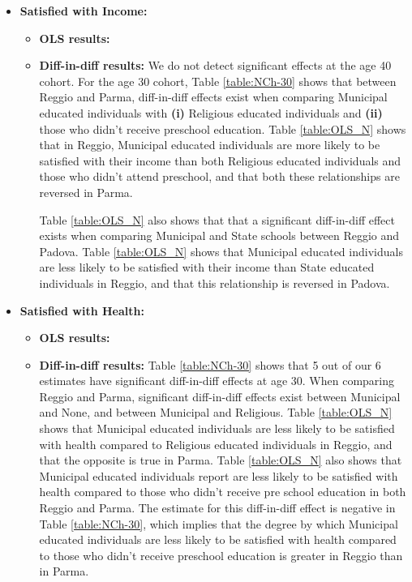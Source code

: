 \documentclass[11pt]{article}
\begin{document}
\begin{itemize}
\item \textbf{Satisfied with Income:} 
	
	\begin{itemize}
	\item \textbf{OLS results:} 
	
	\item \textbf{Diff-in-diff results:} We do not detect significant effects at the age 40 cohort. For the age 30 cohort, Table \ref{table:NCh-30} shows that between Reggio and Parma, diff-in-diff effects exist when comparing Municipal educated individuals with \textbf{(i)} Religious educated individuals and  \textbf{(ii)} those who didn't receive preschool education. Table \ref{table:OLS_N} shows that in Reggio, Municipal educated individuals are more likely to be satisfied with their income than both Religious educated individuals and those who didn't attend preschool, and that both these relationships are reversed in Parma. 
	
	Table \ref{table:OLS_N} also shows that that a significant diff-in-diff effect exists when comparing Municipal and State schools between Reggio and Padova. Table \ref{table:OLS_N} shows that Municipal educated individuals are less likely to be satisfied with their income than State educated individuals in Reggio, and that this relationship is reversed in Padova.
	\end{itemize}


\item \textbf{Satisfied with Health:} 
	
	\begin{itemize}
	\item \textbf{OLS results:} 
	
	\item \textbf{Diff-in-diff results:}  Table \ref{table:NCh-30} shows that 5 out of our 6 estimates have significant diff-in-diff effects at age 30. When comparing Reggio and Parma, significant diff-in-diff effects exist between Municipal and None, and between Municipal and Religious. Table \ref{table:OLS_N} shows that Municipal educated individuals are less likely to be satisfied with health compared to Religious educated individuals in Reggio, and that the opposite is true in Parma.  Table \ref{table:OLS_N} also shows that  Municipal educated individuals report are less likely to be satisfied with health compared to those who didn't receive pre school education in both Reggio and Parma. The estimate for this diff-in-diff effect is negative in Table \ref{table:NCh-30}, which implies that the degree by which Municipal educated individuals are less likely to be satisfied with health compared to those who didn't receive preschool education is greater in Reggio than in Parma.
	

\end{itemize}
\end{itemize}
\end{document}
